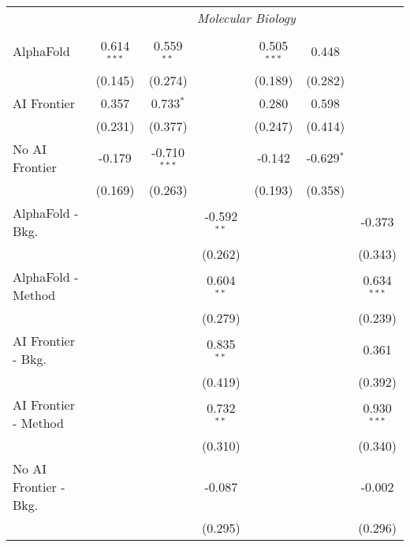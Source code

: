 \begin{tabular}{lcccccc}
 & \multicolumn{6}{c}{\textit{Molecular Biology}} \\ \\
   AlphaFold               & 0.614$^{***}$ & 0.559$^{**}$   &               & 0.505$^{***}$ & 0.448        &   \\   
                           & (0.145)       & (0.274)        &               & (0.189)       & (0.282)      &   \\   
   AI Frontier             & 0.357         & 0.733$^{*}$    &               & 0.280         & 0.598        &   \\   
                           & (0.231)       & (0.377)        &               & (0.247)       & (0.414)      &   \\   
   No AI Frontier          & -0.179        & -0.710$^{***}$ &               & -0.142        & -0.629$^{*}$ &   \\   
                           & (0.169)       & (0.263)        &               & (0.193)       & (0.358)      &   \\   
   AlphaFold - Bkg.        &               &                & -0.592$^{**}$ &               &              & -0.373\\   
                           &               &                & (0.262)       &               &              & (0.343)\\   
   AlphaFold - Method      &               &                & 0.604$^{**}$  &               &              & 0.634$^{***}$\\   
                           &               &                & (0.279)       &               &              & (0.239)\\   
   AI Frontier - Bkg.      &               &                & 0.835$^{**}$  &               &              & 0.361\\   
                           &               &                & (0.419)       &               &              & (0.392)\\   
   AI Frontier - Method    &               &                & 0.732$^{**}$  &               &              & 0.930$^{***}$\\   
                           &               &                & (0.310)       &               &              & (0.340)\\   
   No AI Frontier - Bkg.   &               &                & -0.087        &               &              & -0.002\\   
                           &               &                & (0.295)       &               &              & (0.296)\\   

\end{tabular}
